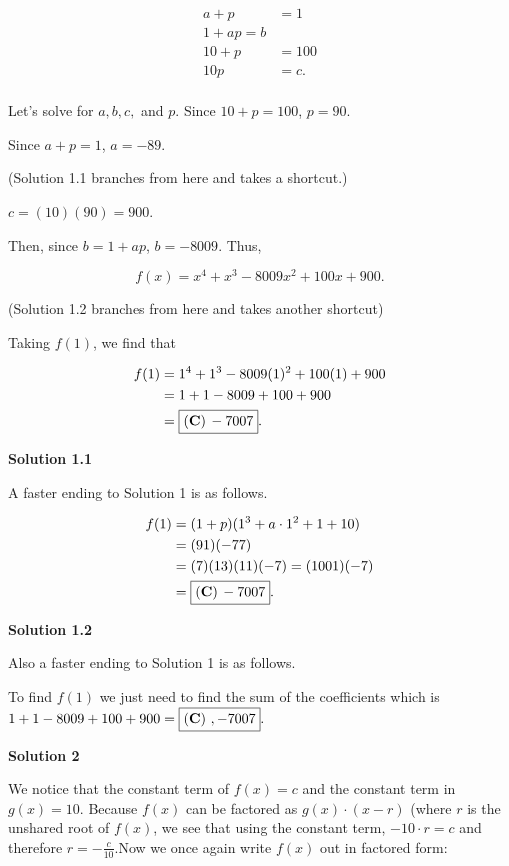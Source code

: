 \begin{enumerate}
 
 \begin{align*} a+p&=1\\ 1+ap=b\\ 10+p&=100\\ 10p&=c.\\ \end{align*}


 
Let's solve for $a,b,c,$ and $p$. Since $10+p=100$, $p=90$.

 Since $a+p=1$, $a=-89$. 

 (Solution 1.1 branches from here and takes a shortcut.)

 $c=(10)(90)=900$.

 Then, since $b=1+ap$, $b=-8009$. Thus,

 
 \[f(x)=x^4+x^3-8009x^2+100x+900.\]

 (Solution 1.2 branches from here and takes another shortcut)

 Taking $f(1)$, we find that

 
 \begin{align*} f(1)&=1^4+1^3-8009(1)^2+100(1)+900\\ &=1+1-8009+100+900\\ &=\boxed{\bold{(C)}\, -7007}.\\ \end{align*}





\textbf{Solution 1.1}

A faster ending to Solution 1 is as follows.

 
 \begin{align*} f(1)&=(1+p)(1^3+a\cdot1^2+1+10)\\ &=(91)(-77)\\ &= (7)(13)(11)(-7) = (1001)(-7) \\ &=\boxed{\bold{(C)}\, -7007}.\\ \end{align*}





\textbf{Solution 1.2}

Also a faster ending to Solution 1 is as follows.

 To find $f(1)$ we just need to find the sum of the coefficients which is $1 + 1 - 8009 + 100 + 900= \boxed{\bold{(C)} \ , -7007}.$




\textbf{Solution 2}

We notice that the constant term of $f(x)=c$ and the constant term in $g(x)=10$. Because $f(x)$ can be factored as $g(x) \cdot (x- r)$ (where $r$ is the unshared root of $f(x)$, we see that using the constant term, $-10 \cdot r = c$ and therefore $r = -\frac{c}{10}$.Now we once again write $f(x)$ out in factored form: 


\end{enumerate}
